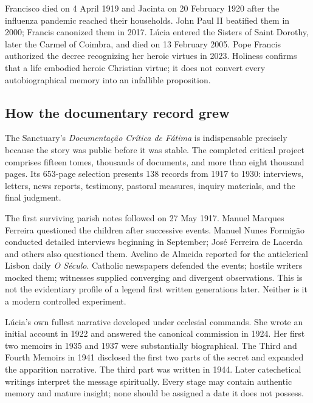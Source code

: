 Francisco died on 4 April 1919 and Jacinta on 20 February 1920 after the influenza pandemic reached their households. John Paul II beatified them in 2000; Francis canonized them in 2017. Lúcia entered the Sisters of Saint Dorothy, later the Carmel of Coimbra, and died on 13 February 2005. Pope Francis authorized the decree recognizing her heroic virtues in 2023. Holiness confirms that a life embodied heroic Christian virtue; it does not convert every autobiographical memory into an infallible proposition.

\subsection{How the documentary record grew}

The Sanctuary's \emph{Documentação Crítica de Fátima} is indispensable precisely because the story was public before it was stable. The completed critical project comprises fifteen tomes, thousands of documents, and more than eight thousand pages. Its 653-page selection presents 138 records from 1917 to 1930: interviews, letters, news reports, testimony, pastoral measures, inquiry materials, and the final judgment.

The first surviving parish notes followed on 27 May 1917. Manuel Marques Ferreira questioned the children after successive events. Manuel Nunes Formigão conducted detailed interviews beginning in September; José Ferreira de Lacerda and others also questioned them. Avelino de Almeida reported for the anticlerical Lisbon daily \emph{O Século}. Catholic newspapers defended the events; hostile writers mocked them; witnesses supplied converging and divergent observations. This is not the evidentiary profile of a legend first written generations later. Neither is it a modern controlled experiment.

Lúcia's own fullest narrative developed under ecclesial commands. She wrote an initial account in 1922 and answered the canonical commission in 1924. Her first two memoirs in 1935 and 1937 were substantially biographical. The Third and Fourth Memoirs in 1941 disclosed the first two parts of the secret and expanded the apparition narrative. The third part was written in 1944. Later catechetical writings interpret the message spiritually. Every stage may contain authentic memory and mature insight; none should be assigned a date it does not possess.


